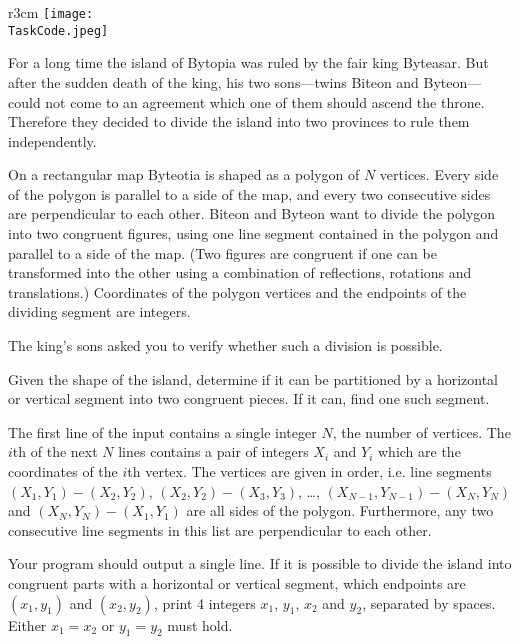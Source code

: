 \documentclass{boi2014}
\renewcommand{\TaskCode}{demarcation}
\begin{document}
    \begin{wrapfigure}{r}{3cm}
        \vspace{-24pt}
		\texttt{[image: \\TaskCode.jpeg]}
	\end{wrapfigure}

    For a long time the island of Bytopia was ruled by the fair king
    Byteasar. But after the sudden death
    of the king, his two sons---twins Biteon and Byteon---could
    not come to an agreement which one of them should ascend the throne.
    Therefore they decided to divide the island into two provinces to
    rule them independently.  
 
    On a rectangular map Byteotia is shaped as a polygon of $N$ vertices. Every
    side of the polygon is parallel to a side of the map, and every two
    consecutive sides are perpendicular to each other.  Biteon and Byteon want
    to divide the polygon into two congruent figures, using one line segment
    contained in the polygon and parallel to a side of the map.  (Two figures
    are congruent if one can be transformed into the other using a combination
    of reflections, rotations and translations.) Coordinates of the polygon
    vertices and the endpoints of the dividing segment are integers.  
 
    The king's sons asked you to verify whether such a division is
    possible.

    \Task
    Given the shape of the island, determine if it can be partitioned
    by a horizontal or vertical segment into two congruent pieces. If
    it can, find one such segment.
    
    \Input
    The first line of the input contains a single integer $N$, the number of
    vertices. The $i$th of the next $N$ lines contains a pair of integers $X_i$
    and $Y_i$ which are the coordinates of the $i$th vertex.
    The vertices are given in order, i.e. line segments $(X_1,Y_1) - (X_2,Y_2)$,
    $(X_2,Y_2) - (X_3,Y_3)$, \ldots, $(X_{N-1},Y_{N-1}) - (X_N,Y_N)$ and
    $(X_N,Y_N) - (X_1,Y_1)$ are all sides of the polygon.
    Furthermore, any two consecutive line segments in this list are
    perpendicular to each other.

	\Output
	Your program should output a single line. If it is possible to divide the
	island into congruent parts with a horizontal or vertical segment, which
	endpoints are $(x_1, y_1)$ and $(x_2, y_2)$, print 4 integers $x_1$,
	$y_1$, $x_2$ and $y_2$, separated by spaces.
	Either $x_1 = x_2$ or $y_1 = y_2$ must hold.
\end{document}
